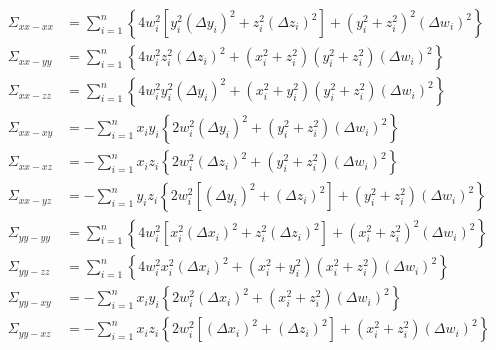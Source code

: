 \documentclass[a4paper,11pt]{article}
\begin{document}
\begin{align}
  \Sigma_{xx-xx} &= \sum_{i=1}^n \left\{
  4w_i^2 \left[ y_i^2(\Delta y_i)^2 + z_i^2(\Delta z_i)^2 \right] +
  \left(y_i^2 + z_i^2\right)^2(\Delta w_i)^2
  \right\}\\
  \Sigma_{xx-yy} &= \sum_{i=1}^n \left\{
  4w_i^2z_i^2 (\Delta z_i)^2 + (x_i^2 + z_i^2)(y_i^2 + z_i^2)(\Delta w_i)^2
  \right\}\\
  \Sigma_{xx-zz} &= \sum_{i=1}^n \left\{
  4w_i^2y_i^2 (\Delta y_i)^2 + (x_i^2 + y_i^2)(y_i^2 + z_i^2)(\Delta w_i)^2
  \right\}\\
  \Sigma_{xx-xy} &= -\sum_{i=1}^n x_iy_i  \left\{
  2w_i^2 (\Delta y_i)^2 + (y_i^2 + z_i^2)(\Delta w_i)^2
  \right\}\\
  \Sigma_{xx-xz} &= -\sum_{i=1}^n x_iz_i \left\{
  2w_i^2 (\Delta z_i)^2 + (y_i^2 + z_i^2)(\Delta w_i)^2
  \right\}\\
  \Sigma_{xx-yz} &= -\sum_{i=1}^n y_iz_i \left\{
  2w_i^2 \left[ (\Delta y_i)^2 + (\Delta z_i)^2 \right] +
  (y_i^2 + z_i^2)(\Delta w_i)^2
  \right\}\\
  \Sigma_{yy-yy} &= \sum_{i=1}^n \left\{
  4w_i^2 \left[ x_i^2(\Delta x_i)^2 + z_i^2(\Delta z_i)^2 \right] +
  \left(x_i^2 + z_i^2\right)^2(\Delta w_i)^2
  \right\}\\
  \Sigma_{yy-zz} &= \sum_{i=1}^n \left\{
  4w_i^2x_i^2 (\Delta x_i)^2 + (x_i^2 + y_i^2)(x_i^2 + z_i^2)(\Delta w_i)^2
  \right\}\\
  \Sigma_{yy-xy} &= -\sum_{i=1}^n x_iy_i \left\{
  2w_i^2 (\Delta x_i)^2 + (x_i^2 + z_i^2)(\Delta w_i)^2
  \right\}\\
  \Sigma_{yy-xz} &= -\sum_{i=1}^n x_iz_i \left\{
  2w_i^2 \left[ (\Delta x_i)^2 + (\Delta z_i)^2 \right] +
  (x_i^2 + z_i^2)(\Delta w_i)^2
  \right\}
\end{align}
\end{document}
